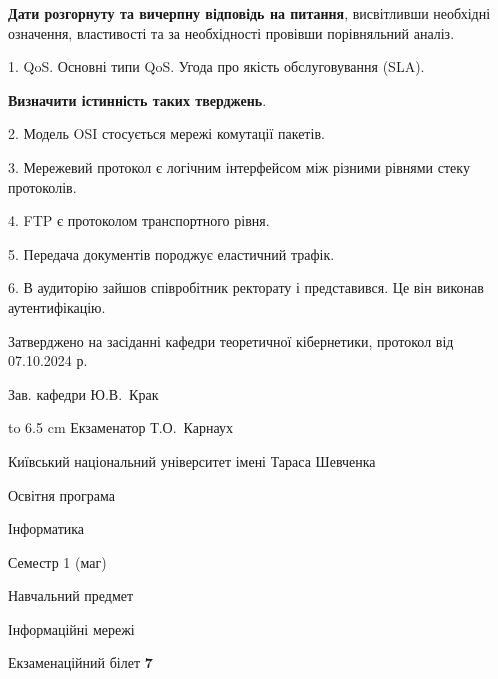 \documentclass[12pt, ukrainian]{article}
\begin{document}
{
\qquad\textbf{Дати розгорнуту та вичерпну відповідь на питання}, висвітливши необхідні означення, властивості та за необхідності провівши порівняльний аналіз.

1. QoS. Основні типи QoS. Угода про якість обслуговування (SLA).



\qquad\textbf{Визначити істинність таких тверджень}.

2. Модель OSI стосується мережі комутації пакетів.


3. Мережевий протокол є логічним інтерфейсом між різними рівнями стеку протоколів.


4. FTP є протоколом транспортного рівня.


5. Передача документів породжує еластичний трафік.


6. В аудиторію зайшов співробітник ректорату і представився. Це він виконав аутентифікацію.

}
{\smallskip\smallskip \begin {scriptsize} Затверджено на засіданні кафедри теоретичної кібернетики, протокол   від   07.10.2024 р.\par\smallskip\smallskip\smallskip\smallskip
{\parbox {6.5 cm} {Зав. кафедри \dotfill Ю.В.~Крак}}\hspace {0.7cm} {\hbox to 6.5 cm { Екзаменатор \dotfill Т.О.~Карнаух}} \end{scriptsize}}
\newpage
{{\begin {scriptsize}\par
{ \center  Київський національний університет імені Тараса Шевченка \par}
{\parbox {5 cm}{Освітня програма \hfill}{\parbox {7 cm}{Інформатика\hfill}}\parbox {6 cm}{\hfill Семестр 1 (маг)}}\par
{\parbox {5 cm} {Навчальний предмет \hfill}\parbox {7 cm}{Інформаційні мережі \hfill}\parbox {6cm}{\hfill}\par}\vspace{-15pt} \end{scriptsize}}{\center Екзаменаційний білет \No \textbf { 7 }\par}}
\end{document}
